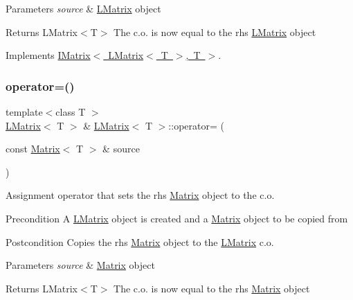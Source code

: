 \begin{DoxyParams}{Parameters}
{\em source} & \mbox{\hyperlink{class_l_matrix}{L\+Matrix}} object \\
\hline
\end{DoxyParams}
\begin{DoxyReturn}{Returns}
L\+Matrix$<$\+T$>$ The c.\+o. is now equal to the rhs \mbox{\hyperlink{class_l_matrix}{L\+Matrix}} object 
\end{DoxyReturn}


Implements \mbox{\hyperlink{class_i_matrix_a9eeb68de7e1d37d1aab439c78fea9be3}{I\+Matrix$<$ L\+Matrix$<$ T $>$, T $>$}}.

\mbox{\label{class_l_matrix_a4417a98f81bcd9797241cf658b8ba400}} 
\subsubsection{\texorpdfstring{operator=()}{operator=()}\hspace{0.1cm}{\footnotesize\ttfamily [2/2]}}
{\footnotesize\ttfamily template$<$class T $>$ \\
\mbox{\hyperlink{class_l_matrix}{L\+Matrix}}$<$ T $>$ \& \mbox{\hyperlink{class_l_matrix}{L\+Matrix}}$<$ T $>$\+::operator= (\begin{DoxyParamCaption}\item[{const \mbox{\hyperlink{class_matrix}{Matrix}}$<$ T $>$ \&}]{source }\end{DoxyParamCaption})}



Assignment operator that sets the rhs \mbox{\hyperlink{class_matrix}{Matrix}} object to the c.\+o. 

\begin{DoxyPrecond}{Precondition}
A \mbox{\hyperlink{class_l_matrix}{L\+Matrix}} object is created and a \mbox{\hyperlink{class_matrix}{Matrix}} object to be copied from 
\end{DoxyPrecond}
\begin{DoxyPostcond}{Postcondition}
Copies the rhs \mbox{\hyperlink{class_matrix}{Matrix}} object to the \mbox{\hyperlink{class_l_matrix}{L\+Matrix}} c.\+o. 
\end{DoxyPostcond}

\begin{DoxyParams}{Parameters}
{\em source} & \mbox{\hyperlink{class_matrix}{Matrix}} object \\
\hline
\end{DoxyParams}
\begin{DoxyReturn}{Returns}
L\+Matrix$<$\+T$>$ The c.\+o. is now equal to the rhs \mbox{\hyperlink{class_matrix}{Matrix}} object 
\end{DoxyReturn}
\mbox{\label{class_l_matrix_a7eab2a6c57437448d21a04484844e359}} 
